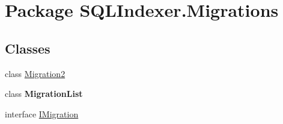 \hypertarget{namespace_s_q_l_indexer_1_1_migrations}{\section{Package S\-Q\-L\-Indexer.\-Migrations}
\label{namespace_s_q_l_indexer_1_1_migrations}
}
\subsection*{Classes}
\begin{DoxyCompactItemize}
\item 
class \hyperlink{class_s_q_l_indexer_1_1_migrations_1_1_migration2}{Migration2}
\item 
class {\bfseries Migration\-List}
\item 
interface \hyperlink{interface_s_q_l_indexer_1_1_migrations_1_1_i_migration}{I\-Migration}
\end{DoxyCompactItemize}
